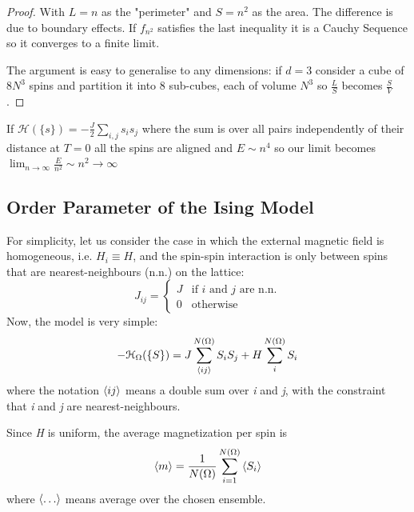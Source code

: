 \documentclass[../../Main/Main.tex]{subfiles}
\begin{document}
\begin{proof}
With $L =n$ as the "perimeter" and $S = n^{2}$ as the area. The difference is due to boundary effects.
If $f_{n^{2}}$ satisfies the last inequality it is a Cauchy Sequence so it converges to a finite limit.

The argument is easy to generalise to any dimensions: if $d=3$ consider a cube of $8N^{3}$ spins and partition it into $8$ sub-cubes, each of volume $N^{3}$ so $\frac{L}{S}$ becomes $\frac{S}{V}$.
\end{proof}
\begin{remark}
If $\mathcal{H}(\{ s \}) = -\frac{J}{2} \sum_{{i,j}} s_{i}s_{j}$ where the sum is over all pairs independently of their distance at $T = 0$ all the spins are aligned and $E \sim n^{4}$ so our limit becomes $\lim_{ n \to \infty } \frac{E}{n^{2}} \sim n^{2} \to \infty$
\end{remark}

















\subsection{Order Parameter of the Ising Model}
For simplicity, let us consider the case in which the external magnetic field is homogeneous, i.e. \( H_i \equiv H \), and the spin-spin interaction is only between spins that are nearest-neighbours (n.n.) on the lattice:
\begin{equation}
J_{ij} =
  \begin{cases}
  J & \text{if } i \text{ and } j \text{ are n.n.} \\
  0 & \text{otherwise}
  \end{cases}
\end{equation}
Now, the model is very simple:
\begin{equation}
  - \mathcal{H}_ \Omega ( \{ S \}  ) = J \sum_{\expval{ij} }^{N (\Omega )} S_i S_j + H \sum_{i}^{N(\Omega )} S_i
  \label{eq:6_0}
\end{equation}
where the notation \( \expval{ij}  \) means a double sum over \emph{i} and \emph{j}, with the constraint that \emph{i} and \emph{j} are nearest-neighbours.

Since \emph{H} is uniform, the average magnetization per spin is
\begin{equation}
  \expval{m} = \frac{1}{N (\Omega )} \sum_{i=1}^{N (\Omega )} \expval{S_i}
\end{equation}
where \( \expval{\dots}  \)  means average over the chosen ensemble.
\end{document}
